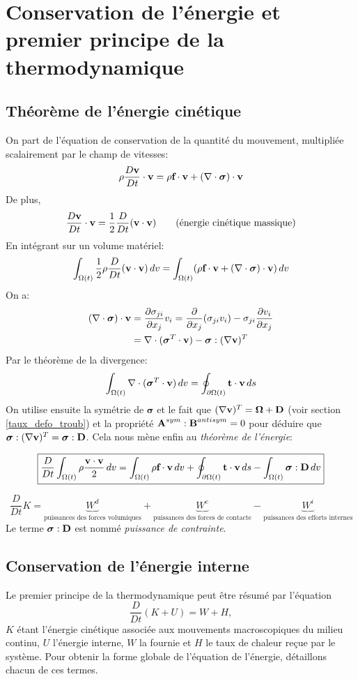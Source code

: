 \section{Conservation de l'énergie et premier principe de la thermodynamique}
\subsection{Théorème de l'énergie cinétique}
On part de l'équation de conservation de la quantité du mouvement, multipliée scalairement par le champ de vitesses:
$$\rho\frac{D\textbf{v}}{Dt}\cdot\textbf{v}=\rho\textbf{f}\cdot\textbf{v}+(\nabla\cdot\boldsymbol{\sigma})\cdot\textbf{v}$$
De plus, $$\frac{D\textbf{v}}{Dt}\cdot\textbf{v}=\frac{1}{2}\frac{D}{Dt}(\textbf{v}\cdot\textbf{v})\qquad\text{(énergie cinétique massique)}$$
En intégrant sur un volume matériel:
$$\int_{\Omega (t)}\frac{1}{2}\rho\frac{D}{Dt}(\textbf{v}\cdot\textbf{v})\,dv=\int_{\Omega (t)}(\rho\textbf{f}\cdot\textbf{v}+(\nabla\cdot\boldsymbol{\sigma})\cdot\textbf{v})\,dv$$
On a:
\begin{align*}
(\nabla\cdot\boldsymbol{\sigma})\cdot\textbf{v}&=\frac{\partial \sigma_{ji}}{\partial x_j}v_i=\frac{\partial}{\partial x_j}(\sigma_{ji}v_i)-\sigma_{ji}\frac{\partial v_i}{\partial x_j}\\
 &=\nabla\cdot(\boldsymbol{\sigma}^T\cdot\textbf{v})-\boldsymbol{\sigma}:(\nabla\textbf{v})^T\\
\end{align*}
Par le théorème de la divergence: $$\int_{\Omega (t)}\nabla\cdot(\boldsymbol{\sigma}^T\cdot\textbf{v})\,dv=\oint_{\partial \Omega (t)}\textbf{t}\cdot\textbf{v}\,ds$$
On utilise ensuite la symétrie de $\boldsymbol{\sigma}$ et le fait que $(\nabla\textbf{v})^T=\boldsymbol{\Omega}+\textbf{D}$ (voir section \ref{taux_defo_troub}) et la propriété $\textbf{A}^{sym}:\textbf{B}^{antisym}=0$ pour déduire que $\boldsymbol{\sigma}:(\nabla\textbf{v})^T=\boldsymbol{\sigma}:\textbf{D}$. Cela nous mène enfin au \emph{théorème de l'énergie}:

$$\boxed{\frac{D}{Dt}\int_{\Omega (t)}\rho\frac{\textbf{v}\cdot\textbf{v}}{2}\,dv=\int_{\Omega (t)}\rho\textbf{f}\cdot\textbf{v}\,dv+\oint_{\partial \Omega (t)}\textbf{t}\cdot\textbf{v}\,ds-\int_{\Omega (t)}\boldsymbol{\sigma}:\textbf{D}\,dv}$$

$$\frac{D}{Dt}K=\underbrace{W^d}_{\text{puissances des forces volumiques}}+\underbrace{W^c}_{\text{puissances des forces de contacte}}-\underbrace{W^i}_{\text{puissances des efforts internes}}$$
Le terme $\boldsymbol{\sigma}:\textbf{D}$ est nommé \emph{puissance de contrainte}.
\subsection{Conservation de l'énergie interne}
Le premier principe de la thermodynamique peut être résumé par l'équation \begin{equation}\label{eq:premier_principe}\frac{D}{Dt}(K+U)=W+H,\end{equation} $K$ étant l'énergie cinétique associée aux mouvements macroscopiques du milieu continu, $U$ l'énergie interne, $W$ la  fournie et $H$ le taux de chaleur reçue par le système. Pour obtenir la forme globale de l'équation de l'énergie, détaillons chacun de ces termes.
